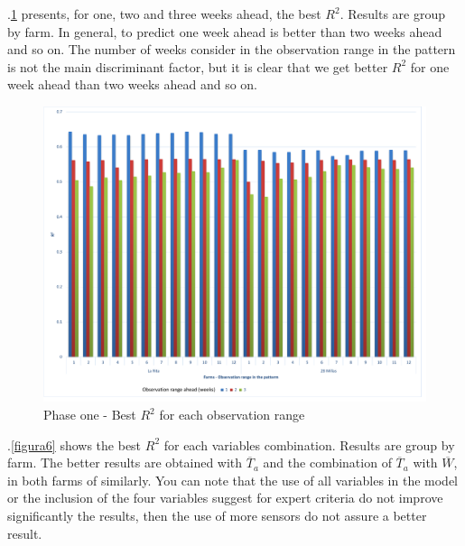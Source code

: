 \documentclass[review]{elsarticle}
\begin{document}
\figurename $.$\ref{figura5} presents, for one, two and three weeks ahead, the best $R^2$. Results are group by farm. In general, to predict one week ahead is better than two weeks ahead and so on. The number of weeks consider in the observation range in the pattern is not the main discriminant factor, but it is clear that we get better $R^2$ for one week ahead than two weeks ahead and so on.

\begin{figure}[H] 
 \centering
 \includegraphics[scale=.5]{Phase_one_Best_R2_for_each_number_of_observation_range_in_the_patterm}
 \caption{Phase one - Best $R^2$ for each observation range} 
 \label{figura5} 
\end{figure}

\figurename $.$\ref{figura6} shows the best $R^2$ for each variables combination. Results are group by farm. The better results are obtained with $\overline{T}_{a}$ and the combination of $\overline{T}_{a}$ with $\overline{W}$, in both farms of similarly. You can note that the use of all variables in the model or the inclusion of the four variables suggest for expert criteria do not improve significantly the results, then the use of more sensors do not assure a better result. 
\end{document}
